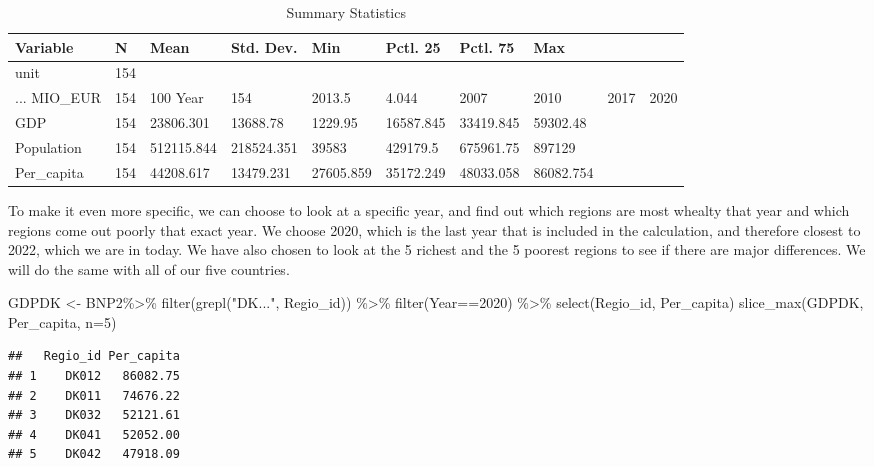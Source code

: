 \documentclass[
]{article}
\newenvironment{Shaded}{\begin{snugshade}}{\end{snugshade}}
\newcommand{\AttributeTok}[1]{\textcolor[rgb]{0.77,0.63,0.00}{#1}}
\newcommand{\DecValTok}[1]{\textcolor[rgb]{0.00,0.00,0.81}{#1}}
\newcommand{\FunctionTok}[1]{\textcolor[rgb]{0.00,0.00,0.00}{#1}}
\newcommand{\NormalTok}[1]{#1}
\newcommand{\OtherTok}[1]{\textcolor[rgb]{0.56,0.35,0.01}{#1}}
\newcommand{\SpecialCharTok}[1]{\textcolor[rgb]{0.00,0.00,0.00}{#1}}
\newcommand{\StringTok}[1]{\textcolor[rgb]{0.31,0.60,0.02}{#1}}
\begin{document}
\begin{table}

\caption{\label{tab:unnamed-chunk-3}Summary Statistics}
\centering
\begin{tabular}[t]{llllllll}
\toprule
Variable & N & Mean & Std. Dev. & Min & Pctl. 25 & Pctl. 75 & Max\\
\midrule
unit & 154 &  &  &  &  &  & \\
... MIO_EUR & 154 & 100%
Year & 154 & 2013.5 & 4.044 & 2007 & 2010 & 2017 & 2020\\
GDP & 154 & 23806.301 & 13688.78 & 1229.95 & 16587.845 & 33419.845 & 59302.48\\
Population & 154 & 512115.844 & 218524.351 & 39583 & 429179.5 & 675961.75 & 897129\\
\addlinespace
Per_capita & 154 & 44208.617 & 13479.231 & 27605.859 & 35172.249 & 48033.058 & 86082.754\\
\bottomrule
\end{tabular}
\end{table}

To make it even more specific, we can choose to look at a specific year,
and find out which regions are most whealty that year and which regions
come out poorly that exact year. We choose 2020, which is the last year
that is included in the calculation, and therefore closest to 2022,
which we are in today. We have also chosen to look at the 5 richest and
the 5 poorest regions to see if there are major differences. We will do
the same with all of our five countries.

\begin{Shaded}
\begin{Highlighting}[]
\NormalTok{GDPDK }\OtherTok{\textless{}{-}}\NormalTok{ BNP2}\SpecialCharTok{\%\textgreater{}\%}
  \FunctionTok{filter}\NormalTok{(}\FunctionTok{grepl}\NormalTok{(}\StringTok{"DK..."}\NormalTok{, Regio\_id)) }\SpecialCharTok{\%\textgreater{}\%}
  \FunctionTok{filter}\NormalTok{(Year}\SpecialCharTok{==}\DecValTok{2020}\NormalTok{) }\SpecialCharTok{\%\textgreater{}\%}
  \FunctionTok{select}\NormalTok{(Regio\_id, Per\_capita)}
\FunctionTok{slice\_max}\NormalTok{(GDPDK, Per\_capita, }\AttributeTok{n=}\DecValTok{5}\NormalTok{)}
\end{Highlighting}
\end{Shaded}

\begin{verbatim}
##   Regio_id Per_capita
## 1    DK012   86082.75
## 2    DK011   74676.22
## 3    DK032   52121.61
## 4    DK041   52052.00
## 5    DK042   47918.09
\end{verbatim}
\end{document}
